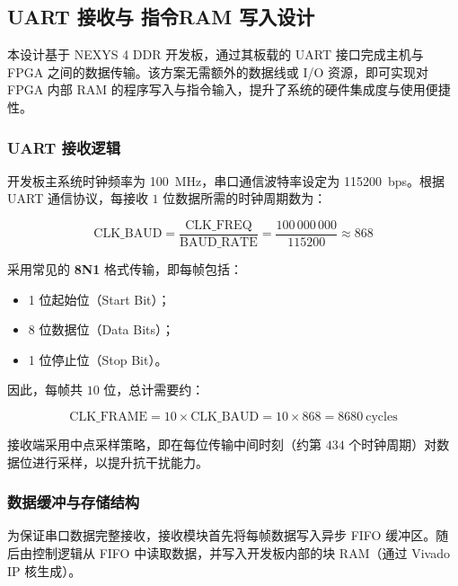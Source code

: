 \documentclass[lang=cn,a4paper,newtx]{elegantpaper}
\begin{document}


\subsection{UART 接收与 指令RAM 写入设计}

本设计基于 NEXYS 4 DDR 开发板，通过其板载的 UART 接口完成主机与 FPGA 之间的数据传输。该方案无需额外的数据线或 I/O 资源，即可实现对 FPGA 内部 RAM 的程序写入与指令输入，提升了系统的硬件集成度与使用便捷性。

\subsubsection{UART 接收逻辑}

开发板主系统时钟频率为 \SI{100}{\mega\hertz}，串口通信波特率设定为 \SI{115200}{bps}。根据 UART 通信协议，每接收 $1$ 位数据所需的时钟周期数为：

\begin{equation}
  \text{CLK\_BAUD} = \frac{\text{CLK\_FREQ}}{\text{BAUD\_RATE}} = \frac{100\,000\,000}{115200} \approx 868
\end{equation}

采用常见的 \textbf{8N1} 格式传输，即每帧包括：

\begin{itemize}
  \item 1 位起始位（Start Bit）；
  \item 8 位数据位（Data Bits）；
  \item 1 位停止位（Stop Bit）。
\end{itemize}

因此，每帧共 $10$ 位，总计需要约：

\begin{equation}
  \text{CLK\_FRAME} = 10 \times \text{CLK\_BAUD} = 10 \times 868 = 8680\ \text{cycles}
\end{equation}

接收端采用中点采样策略，即在每位传输中间时刻（约第 $434$ 个时钟周期）对数据位进行采样，以提升抗干扰能力。

\subsubsection{数据缓冲与存储结构}

为保证串口数据完整接收，接收模块首先将每帧数据写入异步 FIFO 缓冲区。随后由控制逻辑从 FIFO 中读取数据，并写入开发板内部的块 RAM（通过 Vivado IP 核生成）。
\end{document}
